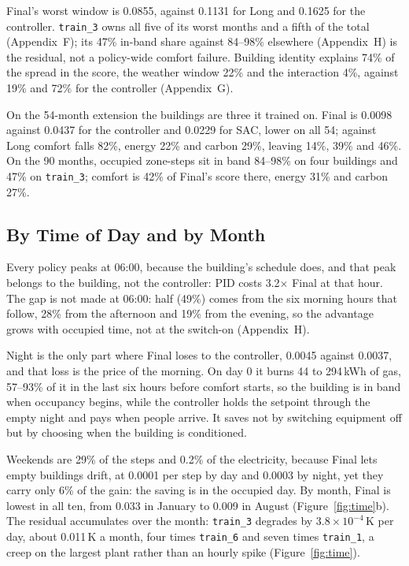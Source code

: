 \documentclass{article}
\begin{document}
Final's worst window is 0.0855, against 0.1131 for Long and 0.1625 for the controller. \texttt{train\_3} owns all five of its worst months and a fifth of the total (Appendix~F); its 47\% in-band share against 84--98\% elsewhere (Appendix~H) is the residual, not a policy-wide comfort failure. Building identity explains 74\% of the spread in the score, the weather window 22\% and the interaction 4\%, against 19\% and 72\% for the controller (Appendix~G).

On the 54-month extension the buildings are three it trained on. Final is 0.0098 against 0.0437 for the controller and 0.0229 for SAC, lower on all 54; against Long comfort falls 82\%, energy 22\% and carbon 29\%, leaving 14\%, 39\% and 46\%. On the 90 months, occupied zone-steps sit in band 84--98\% on four buildings and 47\% on \texttt{train\_3}; comfort is 42\% of Final's score there, energy 31\% and carbon 27\%.

\subsection{By Time of Day and by Month}

Every policy peaks at 06:00, because the building's schedule does, and that peak belongs to the building, not the controller: PID costs 3.2$\times$ Final at that hour. The gap is not made at 06:00: half (49\%) comes from the six morning hours that follow, 28\% from the afternoon and 19\% from the evening, so the advantage grows with occupied time, not at the switch-on (Appendix~H).

Night is the only part where Final loses to the controller, 0.0045 against 0.0037, and that loss is the price of the morning. On day 0 it burns 44 to 294\,kWh of gas, 57--93\% of it in the last six hours before comfort starts, so the building is in band when occupancy begins, while the controller holds the setpoint through the empty night and pays when people arrive. It saves not by switching equipment off but by choosing when the building is conditioned.

Weekends are 29\% of the steps and 0.2\% of the electricity, because Final lets empty buildings drift, at 0.0001 per step by day and 0.0003 by night, yet they carry only 6\% of the gain: the saving is in the occupied day. By month, Final is lowest in all ten, from 0.033 in January to 0.009 in August (Figure~\ref{fig:time}b). The residual accumulates over the month: \texttt{train\_3} degrades by $3.8\times10^{-4}$\,K per day, about 0.011\,K a month, four times \texttt{train\_6} and seven times \texttt{train\_1}, a creep on the largest plant rather than an hourly spike (Figure~\ref{fig:time}).
\end{document}
